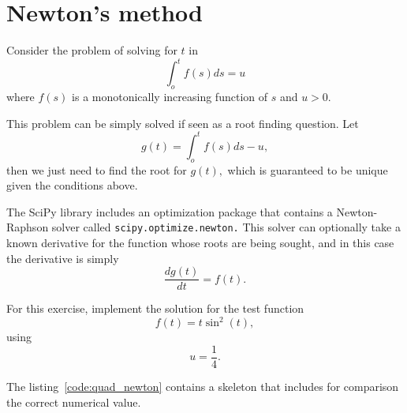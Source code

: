 \section{Newton's method}
\label{sec:quad_newton}

Consider the problem of solving for $t$ in\begin{equation}
\int_{o}^{t}f(s)ds=u\end{equation}
 where $f(s)$ is a monotonically increasing function of $s$ and
$u>0$.

This problem can be simply solved if seen as a root finding question.
Let\begin{equation}
g(t)=\int_{o}^{t}f(s)ds-u,\end{equation}
then we just need to find the root for $g(t),$ which is guaranteed
to be unique given the conditions above. 

The SciPy library includes an optimization package that contains a
Newton-Raphson solver called \texttt{scipy.optimize.newton.} This
solver can optionally take a known derivative for the function whose
roots are being sought, and in this case the derivative is simply
\begin{equation}
\frac{dg(t)}{dt}=f(t).\end{equation}


For this exercise, implement the solution for the test function\[
f(t)=t\sin^{2}(t),\]
 using \[
u=\frac{1}{4}.\]


The listing~\ref{code:quad_newton} contains a skeleton that
includes for comparison the correct numerical value.





